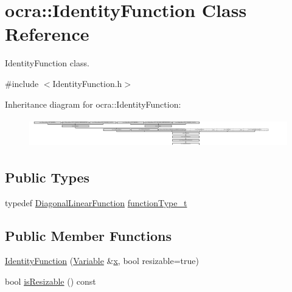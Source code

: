 \hypertarget{classocra_1_1IdentityFunction}{}\section{ocra\+:\+:Identity\+Function Class Reference}
\label{classocra_1_1IdentityFunction}


Identity\+Function class.  




{\ttfamily \#include $<$Identity\+Function.\+h$>$}

Inheritance diagram for ocra\+:\+:Identity\+Function\+:\begin{figure}[H]
\begin{center}
\leavevmode
\includegraphics[height=1.262480cm]{d4/d58/classocra_1_1IdentityFunction}
\end{center}
\end{figure}
\subsection*{Public Types}
\begin{DoxyCompactItemize}
\item 
typedef \hyperlink{classocra_1_1DiagonalLinearFunction}{Diagonal\+Linear\+Function} \hyperlink{classocra_1_1IdentityFunction_a4598384746d901d0a13b712666288894}{function\+Type\+\_\+t}
\end{DoxyCompactItemize}
\subsection*{Public Member Functions}
\begin{DoxyCompactItemize}
\item 
\hyperlink{classocra_1_1IdentityFunction_a65a20f4b0036a5a6ca7b0e92e34dc1b0}{Identity\+Function} (\hyperlink{classocra_1_1Variable}{Variable} \&\hyperlink{classocra_1_1Function_a28825886d1f149c87b112ec2ec1dd486}{x}, bool resizable=true)
\item 
bool \hyperlink{classocra_1_1IdentityFunction_aa468e3e90c544e901ed2d81f6d0eb9f3}{is\+Resizable} () const
\end{DoxyCompactItemize}
